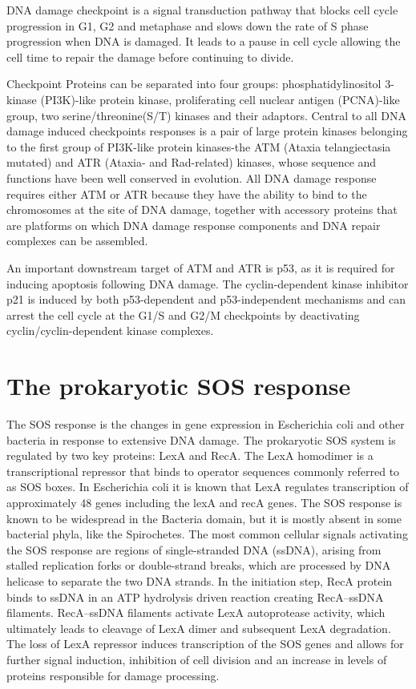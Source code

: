 DNA damage checkpoint is a signal transduction pathway that blocks cell cycle progression in G1, G2 and metaphase and slows down the rate of S phase progression when DNA is damaged. It leads to a pause in cell cycle allowing the cell time to repair the damage before continuing to divide.

Checkpoint Proteins can be separated into four groups: phosphatidylinositol 3-kinase (PI3K)-like protein kinase, proliferating cell nuclear antigen (PCNA)-like group, two serine/threonine(S/T) kinases and their adaptors. Central to all DNA damage induced checkpoints responses is a pair of large protein kinases belonging to the first group of PI3K-like protein kinases-the ATM (Ataxia telangiectasia mutated) and ATR (Ataxia- and Rad-related) kinases, whose sequence and functions have been well conserved in evolution. All DNA damage response requires either ATM or ATR because they have the ability to bind to the chromosomes at the site of DNA damage, together with accessory proteins that are platforms on which DNA damage response components and DNA repair complexes can be assembled.

An important downstream target of ATM and ATR is p53, as it is required for inducing apoptosis following DNA damage. The cyclin-dependent kinase inhibitor p21 is induced by both p53-dependent and p53-independent mechanisms and can arrest the cell cycle at the G1/S and G2/M checkpoints by deactivating cyclin/cyclin-dependent kinase complexes.

\hypertarget{the-prokaryotic-sos-response}{%
\section{The prokaryotic SOS response}\label{the-prokaryotic-sos-response}}

The SOS response is the changes in gene expression in Escherichia coli and other bacteria in response to extensive DNA damage. The prokaryotic SOS system is regulated by two key proteins: LexA and RecA. The LexA homodimer is a transcriptional repressor that binds to operator sequences commonly referred to as SOS boxes. In Escherichia coli it is known that LexA regulates transcription of approximately 48 genes including the lexA and recA genes. The SOS response is known to be widespread in the Bacteria domain, but it is mostly absent in some bacterial phyla, like the Spirochetes. The most common cellular signals activating the SOS response are regions of single-stranded DNA (ssDNA), arising from stalled replication forks or double-strand breaks, which are processed by DNA helicase to separate the two DNA strands. In the initiation step, RecA protein binds to ssDNA in an ATP hydrolysis driven reaction creating RecA--ssDNA filaments. RecA--ssDNA filaments activate LexA autoprotease activity, which ultimately leads to cleavage of LexA dimer and subsequent LexA degradation. The loss of LexA repressor induces transcription of the SOS genes and allows for further signal induction, inhibition of cell division and an increase in levels of proteins responsible for damage processing.

